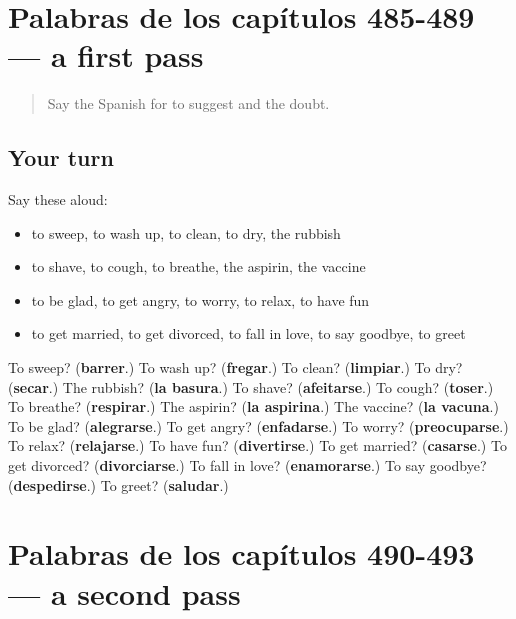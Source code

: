 \section[(dialogue)]{Palabras de los capítulos 485-489 — a first pass}

\label{lesson:ES-R493-repaso-palabras-de-los-capitulos-485-489}



\begin{quote}
Say the Spanish for to suggest and the doubt.
\end{quote}

\subsection*{Your turn}
Say these aloud:

\begin{itemize}
\raggedright
  \item to sweep, to wash up, to clean, to dry, the rubbish
  \item to shave, to cough, to breathe, the aspirin, the vaccine
  \item to be glad, to get angry, to worry, to relax, to have fun
  \item to get married, to get divorced, to fall in love, to say goodbye, to greet
\end{itemize}

\begin{tcolorbox}[breakable,colback=teal!4,colframe=teal!35!black,title={Before you move on}]
To sweep? (\textbf{barrer}.) To wash up? (\textbf{fregar}.) To clean? (\textbf{limpiar}.) To dry? (\textbf{secar}.) The rubbish? (\textbf{la basura}.) To shave? (\textbf{afeitarse}.) To cough? (\textbf{toser}.) To breathe? (\textbf{respirar}.) The aspirin? (\textbf{la aspirina}.) The vaccine? (\textbf{la vacuna}.) To be glad? (\textbf{alegrarse}.) To get angry? (\textbf{enfadarse}.) To worry? (\textbf{preocuparse}.) To relax? (\textbf{relajarse}.) To have fun? (\textbf{divertirse}.) To get married? (\textbf{casarse}.) To get divorced? (\textbf{divorciarse}.) To fall in love? (\textbf{enamorarse}.) To say goodbye? (\textbf{despedirse}.) To greet? (\textbf{saludar}.)
\end{tcolorbox}
\section[(dialogue)]{Palabras de los capítulos 490-493 — a second pass}

\label{lesson:ES-R493-repaso-palabras-de-los-capitulos-490-493}




